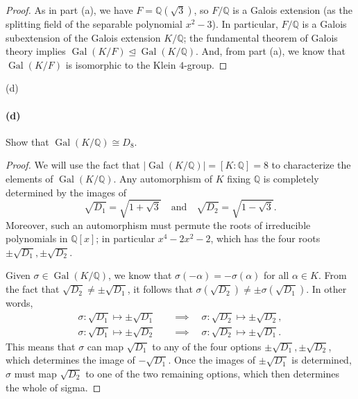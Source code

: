 \documentclass[12pt]{article}
\newenvironment{fullbox}{\begin{lrbox}{\savefullbox}\begin{minipage}{\dimexpr\textwidth-2\fboxsep\relax}}{\end{minipage}\end{lrbox}\begin{center}\framebox[\textwidth]{\usebox{\savefullbox}}\end{center}}
\newenvironment{pbox}[1][]{\begin{fullbox}\ifx#1\empty\else\paragraph{#1}\fi}{\end{fullbox}}
\theoremstyle{definition}
\newcommand{\isp}[1]{\quad\text{#1}\quad}
\newcommand{\Q}{\mathbb{Q}}
\newcommand{\<}{\langle}
\renewcommand{\>}{\rangle}
\newcommand{\isom}{\cong}
\DeclareMathOperator{\Gal}{Gal}
\newcommand{\teq}{\trianglelefteq}
\begin{document}
\begin{proof}
    As in part (a), we have $F = \Q(\sqrt{3})$, so $F/\Q$ is a Galois extension (as the splitting field of the separable polynomial $x^2 - 3$). In particular, $F/\Q$ is a Galois subextension of the Galois extension $K/\Q$; the fundamental theorem of Galois theory implies $\Gal(K/F) \teq \Gal(K/\Q)$. And, from part (a), we know that $\Gal(K/F)$ is isomorphic to the Klein $4$-group.

\end{proof}


\newpage
\begin{pbox}[(d)]
    Show that $\Gal(K/\Q) \isom D_8$.
\end{pbox}

\begin{proof}
    We will use the fact that $|\Gal(K/\Q)| = [K : \Q] = 8$ to characterize the elements of $\Gal(K/\Q)$. Any automorphism of $K$ fixing $\Q$ is completely determined by the images of
    \[
        \sqrt{D_1} = \textstyle\sqrt{1 + \sqrt{3}} \isp{and} \sqrt{D_2} = \sqrt{1 - \sqrt{3}}.
    \]
    Moreover, such an automorphism must permute the roots of irreducible polynomials in $\Q[x]$; in particular $x^4 - 2x^2 - 2$, which has the four roots $\pm\sqrt{D_1}, \pm\sqrt{D_2}$. 
    
    Given $\sigma \in \Gal(K/\Q)$, we know that $\sigma(-\alpha) = - \sigma(\alpha)$ for all $\alpha \in K$. From the fact that $\sqrt{D_2} \ne \pm\sqrt{D_1}$, it follows that $\sigma(\sqrt{D_2}) \ne \pm\sigma(\sqrt{D_1})$. In other words,
    \begin{align*}
        \sigma : \sqrt{D_1} \mapsto \pm\sqrt{D_1} \quad&\implies\quad \sigma: \sqrt{D_2} \mapsto \pm\sqrt{D_2}, \\
        \sigma : \sqrt{D_1} \mapsto \pm\sqrt{D_2} \quad&\implies\quad \sigma: \sqrt{D_2} \mapsto \pm\sqrt{D_1}.
    \end{align*}
    This means that $\sigma$ can map $\sqrt{D_1}$ to any of the four options $\pm\sqrt{D_1}, \pm\sqrt{D_2}$, which determines the image of $-\sqrt{D_1}$. Once the images of $\pm\sqrt{D_1}$ is determined, $\sigma$ must map $\sqrt{D_2}$ to one of the two remaining options, which then determines the whole of sigma.
    

\end{proof}
\end{document}
